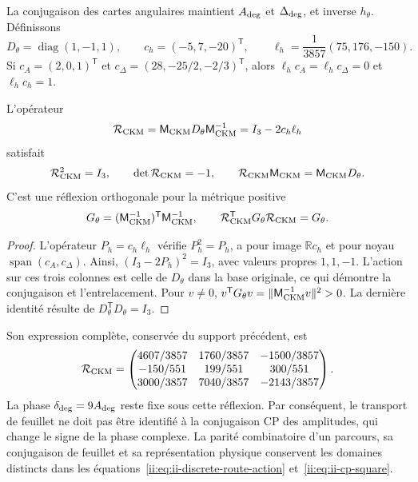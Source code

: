 La conjugaison des cartes angulaires maintient \(A_{\rm deg}\) et
\(\Delta_{\rm deg}\), et inverse \(h_\theta\). Définissons
\begin{equation}
 D_\theta=\operatorname{diag}(1,-1,1),\qquad
 c_h=(-5,7,-20)^{\mathsf T},\qquad
 \ell_h=\frac1{3857}(75,176,-150).
 \label{ii:eq:ii-ckm-sheet-data}
\end{equation}
Si \(c_A=(2,0,1)^{\mathsf T}\) et
\(c_\Delta=(28,-25/2,-2/3)^{\mathsf T}\), alors
\(\ell_hc_A=\ell_hc_\Delta=0\) et \(\ell_hc_h=1\).

\begin{theorem}
L'opérateur
\begin{equation}
 \mathcal R_{\rm CKM}
 =\mathsf M_{\rm CKM}D_\theta\mathsf M_{\rm CKM}^{-1}
 =I_3-2c_h\ell_h
 \label{ii:eq:ii-ckm-reflection}
\end{equation}
satisfait
\begin{equation}
 \mathcal R_{\rm CKM}^2=I_3,\qquad
 \det\mathcal R_{\rm CKM}=-1,\qquad
 \mathcal R_{\rm CKM}\mathsf M_{\rm CKM}
 =\mathsf M_{\rm CKM}D_\theta.
 \label{ii:eq:ii-ckm-intertwining}
\end{equation}
C'est une réflexion orthogonale pour la métrique positive
\begin{equation}
 G_\theta=(\mathsf M_{\rm CKM}^{-1})^{\mathsf T}
                 \mathsf M_{\rm CKM}^{-1},\qquad
 \mathcal R_{\rm CKM}^{\mathsf T}G_\theta\mathcal R_{\rm CKM}=G_\theta.
 \label{ii:eq:ii-ckm-metric}
\end{equation}
\end{theorem}

\begin{proof}
L'opérateur \(P_h=c_h\ell_h\) vérifie \(P_h^2=P_h\), a pour image
\(\mathbb Rc_h\) et pour noyau \(\operatorname{span}(c_A,c_\Delta)\).
Ainsi, \((I_3-2P_h)^2=I_3\), avec valeurs propres \(1,1,-1\).
L'action sur ces trois colonnes est celle de \(D_\theta\) dans la base
originale, ce qui démontre la conjugaison et l'entrelacement.
Pour \(v\ne0\),
\(v^{\mathsf T}G_\theta v=\|\mathsf M_{\rm CKM}^{-1}v\|^2>0\).
La dernière identité résulte de \(D_\theta^{\mathsf T}D_\theta=I_3\).
\end{proof}

Son expression complète, conservée du support précédent, est
\begin{equation}
 \mathcal R_{\rm CKM}=
 \begin{pmatrix}
 4607/3857&1760/3857&-1500/3857\\
 -150/551&199/551&300/551\\
 3000/3857&7040/3857&-2143/3857
 \end{pmatrix}.
 \label{ii:eq:ii-ckm-reflection-matrix}
\end{equation}
La phase \(\delta_{\rm deg}=9A_{\rm deg}\) reste fixe sous cette réflexion. Par conséquent, le transport de feuillet ne doit pas être identifié à la conjugaison CP des amplitudes, qui change le signe de la phase complexe. La parité combinatoire d’un parcours, sa conjugaison de feuillet et sa représentation physique conservent les domaines distincts dans les équations~\eqref{ii:eq:ii-discrete-route-action} et~\eqref{ii:eq:ii-cp-square}.

